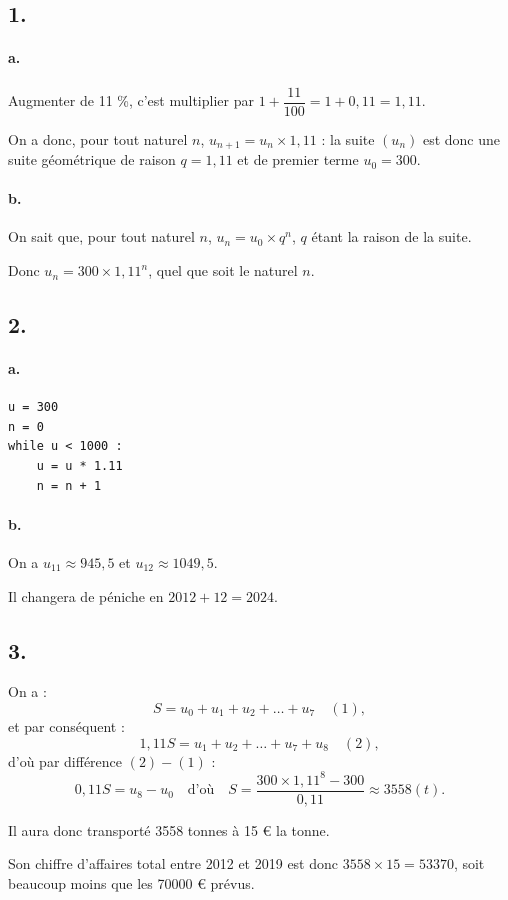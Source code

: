 \subsection*{1.}

\paragraph{a.} Augmenter de 11 \%, c'est multiplier par \( 1 + \dfrac{11}{100} = 1 + 0{,}11 = 1,11 \).

On a donc, pour tout naturel \( n \), \( u_{n+1} = u_n \times 1,11 \) : la suite \( (u_n) \) est donc une suite géométrique de raison \(q = 1{,}11\) et de premier terme \( u_0 = 300 \).

\paragraph{b.} On sait que, pour tout naturel \( n \), \( u_n = u_0 \times q^n \), \( q \) étant la raison de la suite.

Donc \( u_n = 300 \times 1,11^n \), quel que soit le naturel \( n \).

\subsection*{2.}

\paragraph{a.}
\begin{center}
\begin{lstlisting}[style=python]
u = 300
n = 0
while u < 1000 :
    u = u * 1.11
    n = n + 1
\end{lstlisting}
\end{center}

\paragraph{b.} On a \( u_{11} \approx 945{,}5 \) et \( u_{12} \approx 1049{,}5 \).

Il changera de péniche en \( 2012 + 12 = 2024 \).

\subsection*{3.}

On a :
\[
S = u_0 + u_1 + u_2 + \dots + u_7 \quad (1),
\]
et par conséquent :
\[
1,11S = u_1 + u_2 + \dots + u_7 + u_8 \quad (2),
\]
d'où par différence \((2) - (1)\) :
\[
0,11S = u_8 - u_0 \quad \text{d'où} \quad S = \dfrac{300 \times 1,11^8 - 300}{0,11} \approx 3558 (t).
\]

Il aura donc transporté 3558 tonnes à 15 € la tonne.

Son chiffre d'affaires total entre 2012 et 2019 est donc \( 3558 \times 15 = 53370 \), soit beaucoup moins que les 70000 € prévus.
